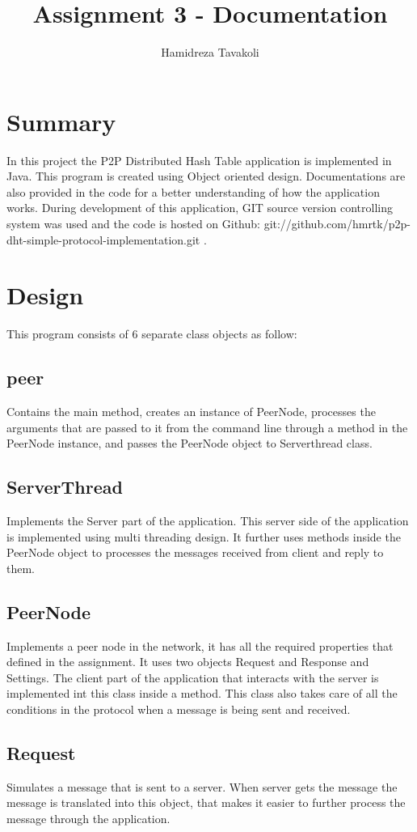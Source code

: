 \documentclass[11pt,a4paper,titlepage]{article}
\author{Hamidreza Tavakoli}
\title{Assignment 3 - Documentation}
\begin{document}
\maketitle

\section{Summary}
In this project the P2P Distributed Hash Table application is implemented in Java. This program is created using Object oriented design. Documentations are also provided in the code for a better understanding of how the application works. During development of this application, GIT source version controlling system was used and the code is hosted on Github: git://github.com/hmrtk/p2p-dht-simple-protocol-implementation.git . 

\section{Design}
This program consists of 6 separate class objects as follow:

\subsection*{peer}
Contains the main method, creates an instance of PeerNode, processes the arguments that are passed to it from the command line through a method in the PeerNode instance, and passes the PeerNode object to Serverthread class.
\subsection*{ServerThread}
Implements the Server part of the application. This server side of the application is implemented using multi threading design. It further uses methods inside the PeerNode object to processes the messages received from client and reply to them.
\subsection*{PeerNode}
Implements a peer node in the network, it has all the required properties that defined in the assignment. It uses two objects Request and Response and Settings. The client part of the application that interacts with the server is implemented int this class inside a method. This class also takes care of all the conditions in the protocol when a message is being sent and received.
\subsection*{Request}
Simulates a message that is sent to a server. When server gets the message the message is translated into this object, that makes it easier to further process the message through the application.
\end{document}
